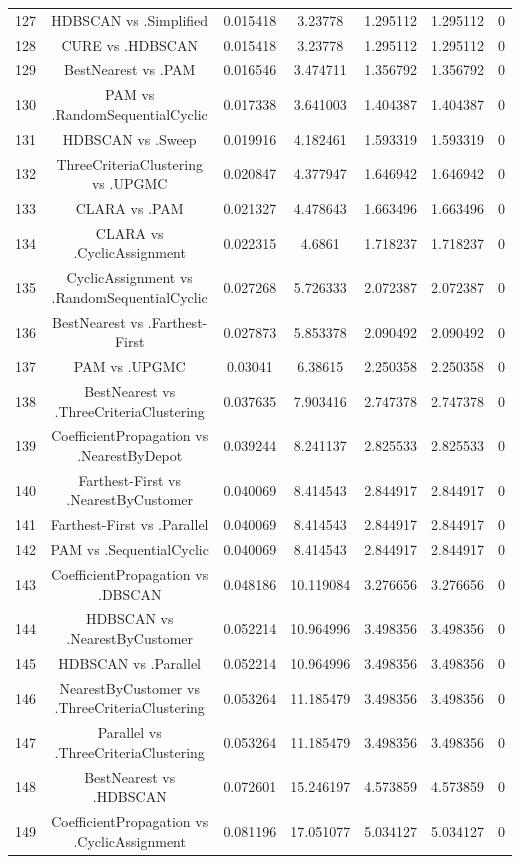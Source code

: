 \documentclass[a4paper,10pt]{article}
\begin{document}
\begin{landscape}
\begin{table}[!htp]
\begin{tabular}{ccccccc}
127&HDBSCAN vs .Simplified&0.015418&3.23778&1.295112&1.295112&0\\
128&CURE vs .HDBSCAN&0.015418&3.23778&1.295112&1.295112&0\\
129&BestNearest vs .PAM&0.016546&3.474711&1.356792&1.356792&0\\
130&PAM vs .RandomSequentialCyclic&0.017338&3.641003&1.404387&1.404387&0\\
131&HDBSCAN vs .Sweep&0.019916&4.182461&1.593319&1.593319&0\\
132&ThreeCriteriaClustering vs .UPGMC&0.020847&4.377947&1.646942&1.646942&0\\
133&CLARA vs .PAM&0.021327&4.478643&1.663496&1.663496&0\\
134&CLARA vs .CyclicAssignment&0.022315&4.6861&1.718237&1.718237&0\\
135&CyclicAssignment vs .RandomSequentialCyclic&0.027268&5.726333&2.072387&2.072387&0\\
136&BestNearest vs .Farthest-First&0.027873&5.853378&2.090492&2.090492&0\\
137&PAM vs .UPGMC&0.03041&6.38615&2.250358&2.250358&0\\
138&BestNearest vs .ThreeCriteriaClustering&0.037635&7.903416&2.747378&2.747378&0\\
139&CoefficientPropagation vs .NearestByDepot&0.039244&8.241137&2.825533&2.825533&0\\
140&Farthest-First vs .NearestByCustomer&0.040069&8.414543&2.844917&2.844917&0\\
141&Farthest-First vs .Parallel&0.040069&8.414543&2.844917&2.844917&0\\
142&PAM vs .SequentialCyclic&0.040069&8.414543&2.844917&2.844917&0\\
143&CoefficientPropagation vs .DBSCAN&0.048186&10.119084&3.276656&3.276656&0\\
144&HDBSCAN vs .NearestByCustomer&0.052214&10.964996&3.498356&3.498356&0\\
145&HDBSCAN vs .Parallel&0.052214&10.964996&3.498356&3.498356&0\\
146&NearestByCustomer vs .ThreeCriteriaClustering&0.053264&11.185479&3.498356&3.498356&0\\
147&Parallel vs .ThreeCriteriaClustering&0.053264&11.185479&3.498356&3.498356&0\\
148&BestNearest vs .HDBSCAN&0.072601&15.246197&4.573859&4.573859&0\\
149&CoefficientPropagation vs .CyclicAssignment&0.081196&17.051077&5.034127&5.034127&0\\

\end{tabular}
\end{table}
\end{landscape}
\end{document}
